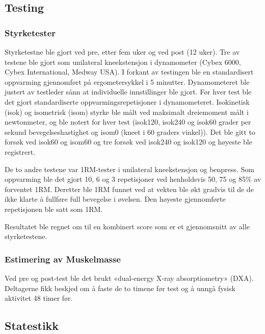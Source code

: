 \documentclass[
]{book}
\begin{document}
\hypertarget{testing}{%
\subsection{Testing}\label{testing}}

\hypertarget{styrketester}{%
\subsubsection{Styrketester}\label{styrketester}}

Styrketestne ble gjort ved pre, etter fem uker og ved post (12 uker). Tre av testene ble gjort som unilateral kneekstensjon i dynamometer (Cybex 6000, Cybex International, Medway USA). I forkant av testingen ble en standardisert oppvarming gjennomført på ergometersykkel i 5 minutter. Dynamometeret ble justert av testleder sånn at individuelle innstillinger ble gjort. Før hver test ble det gjort standardiserte oppvarmingsrepetisjoner i dynamometeret. Isokinetisk (isok) og isometrisk (isom) styrke ble målt ved maksimalt dreiemoment målt i newtonmeter, og ble notert for hver test (isok120, isok240 og isok60 grader per sekund bevegelseshastighet og isom0 (kneet i 60 graders vinkel)). Det ble gitt to forsøk ved isok60 og isom60 og tre forsøk ved isok240 og isok120 og høyeste ble registrert.

De to andre testene var 1RM-tester i unilateral kneekstensjon og benpress. Som oppvarming ble det gjort 10, 6 og 3 repetisjoner ved henholdsvis 50, 75 og 85\% av forventet 1RM. Deretter ble 1RM funnet ved at vekten ble økt gradvis til de de ikke klarte å fullføre full bevegelse i øvelsen. Den høyeste gjennomførte repetisjonen ble satt som 1RM.

Resultatet ble regnet om til en kombinert score som er et gjennomsnitt av alle styrketestene.

\hypertarget{estimering-av-muskelmasse}{%
\subsubsection{Estimering av Muskelmasse}\label{estimering-av-muskelmasse}}

Ved pre og post-test ble det brukt «dual-energy X-ray absorptiometry» (DXA). Deltagerne fikk beskjed om å faste de to timene før test og å unngå fysisk aktivitet 48 timer før.

\hypertarget{statestikk}{%
\subsection{Statestikk}\label{statestikk}}
\end{document}
